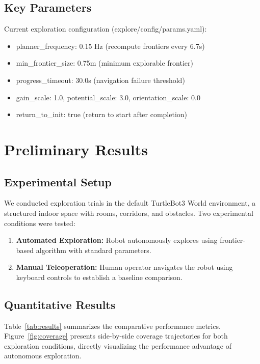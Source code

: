 \documentclass[conference]{IEEEtran}
\begin{document}
\subsection{Key Parameters}

Current exploration configuration (explore/config/params.yaml):
\begin{itemize}
    \item planner\_frequency: 0.15 Hz (recompute frontiers every 6.7s)
    \item min\_frontier\_size: 0.75m (minimum explorable frontier)
    \item progress\_timeout: 30.0s (navigation failure threshold)
    \item gain\_scale: 1.0, potential\_scale: 3.0, orientation\_scale: 0.0
    \item return\_to\_init: true (return to start after completion)
\end{itemize}

\section{Preliminary Results}

\subsection{Experimental Setup}

We conducted exploration trials in the default TurtleBot3 World environment, a structured indoor space with rooms, corridors, and obstacles. Two experimental conditions were tested:

\begin{enumerate}
    \item \textbf{Automated Exploration:} Robot autonomously explores using frontier-based algorithm with standard parameters.
    \item \textbf{Manual Teleoperation:} Human operator navigates the robot using keyboard controls to establish a baseline comparison.
\end{enumerate}

\subsection{Quantitative Results}

Table~\ref{tab:results} summarizes the comparative performance metrics. Figure~\ref{fig:coverage} presents side-by-side coverage trajectories for both exploration conditions, directly visualizing the performance advantage of autonomous exploration.
\end{document}
